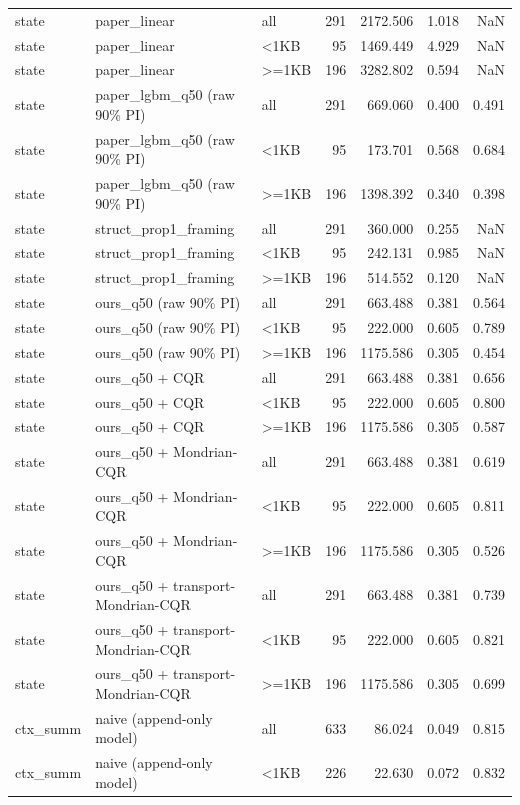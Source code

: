 \begin{table}
\begin{tabular}{lllrrrr}
state & paper\_linear & all & 291 & 2172.506 & 1.018 & NaN \\
state & paper\_linear & <1KB & 95 & 1469.449 & 4.929 & NaN \\
state & paper\_linear & >=1KB & 196 & 3282.802 & 0.594 & NaN \\
state & paper\_lgbm\_q50 (raw 90\% PI) & all & 291 & 669.060 & 0.400 & 0.491 \\
state & paper\_lgbm\_q50 (raw 90\% PI) & <1KB & 95 & 173.701 & 0.568 & 0.684 \\
state & paper\_lgbm\_q50 (raw 90\% PI) & >=1KB & 196 & 1398.392 & 0.340 & 0.398 \\
state & struct\_prop1\_framing & all & 291 & 360.000 & 0.255 & NaN \\
state & struct\_prop1\_framing & <1KB & 95 & 242.131 & 0.985 & NaN \\
state & struct\_prop1\_framing & >=1KB & 196 & 514.552 & 0.120 & NaN \\
state & ours\_q50 (raw 90\% PI) & all & 291 & 663.488 & 0.381 & 0.564 \\
state & ours\_q50 (raw 90\% PI) & <1KB & 95 & 222.000 & 0.605 & 0.789 \\
state & ours\_q50 (raw 90\% PI) & >=1KB & 196 & 1175.586 & 0.305 & 0.454 \\
state & ours\_q50 + CQR & all & 291 & 663.488 & 0.381 & 0.656 \\
state & ours\_q50 + CQR & <1KB & 95 & 222.000 & 0.605 & 0.800 \\
state & ours\_q50 + CQR & >=1KB & 196 & 1175.586 & 0.305 & 0.587 \\
state & ours\_q50 + Mondrian-CQR & all & 291 & 663.488 & 0.381 & 0.619 \\
state & ours\_q50 + Mondrian-CQR & <1KB & 95 & 222.000 & 0.605 & 0.811 \\
state & ours\_q50 + Mondrian-CQR & >=1KB & 196 & 1175.586 & 0.305 & 0.526 \\
state & ours\_q50 + transport-Mondrian-CQR & all & 291 & 663.488 & 0.381 & 0.739 \\
state & ours\_q50 + transport-Mondrian-CQR & <1KB & 95 & 222.000 & 0.605 & 0.821 \\
state & ours\_q50 + transport-Mondrian-CQR & >=1KB & 196 & 1175.586 & 0.305 & 0.699 \\
ctx\_summ & naive (append-only model) & all & 633 & 86.024 & 0.049 & 0.815 \\
ctx\_summ & naive (append-only model) & <1KB & 226 & 22.630 & 0.072 & 0.832 \\

\end{tabular}
\end{table}
